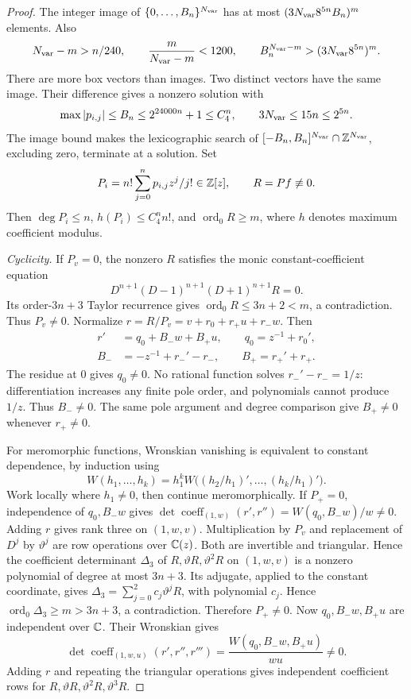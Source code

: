 \begin{proof}
The integer image of $\{0,\ldots,B_n\}^{N_{\rm var}}$ has at most
$(3N_{\rm var}8^{5n}B_n)^m$ elements. Also
\[
 N_{\rm var}-m>n/240,\qquad \frac m{N_{\rm var}-m}<1200,\qquad
 B_n^{N_{\rm var}-m}>(3N_{\rm var}8^{5n})^m.
\]
There are more box vectors than images.
Two distinct vectors have the same image.
Their difference gives a nonzero solution with
\begin{equation}\label{m4:box-bound}
 \max|p_{i,j}|\le B_n\le2^{24000n}+1\le C_4^n,
 \qquad 3N_{\rm var}\le15n\le2^{5n}.
\end{equation}
The image bound makes the lexicographic search of
$[-B_n,B_n]^{N_{\rm var}}\cap\mathbb{Z}^{N_{\rm var}}$, excluding zero, terminate at a
solution. Set
\begin{equation}\label{m4:polynomials}
 P_i=n!\sum_{j=0}^np_{i,j}z^j/j!\in\mathbb{Z}[z],\qquad
 R=Pf\not\equiv0.
\end{equation}
Then $\deg P_i\le n$, $h(P_i)\le C_4^nn!$, and $\operatorname{ord}_0R\ge m$,
where $h$ denotes maximum coefficient modulus.

\emph{Cyclicity.}
If $P_v=0$, the nonzero $R$ satisfies the monic constant-coefficient equation
\[
 D^{n+1}(D-1)^{n+1}(D+1)^{n+1}R=0.
\]
Its order-$3n+3$ Taylor recurrence gives
$\operatorname{ord}_0R\le3n+2<m$, a contradiction. Thus $P_v\ne0$. Normalize $r=R/P_v=v+r_0+r_+u+r_-w$. Then
\begin{equation}\label{m4:derivative}
 \begin{aligned}
 r'&=q_0+B_-w+B_+u,\qquad q_0=z^{-1}+r_0',\\
 B_-&=-z^{-1}+r_-'-r_-,\qquad B_+=r_+'+r_+.
\end{aligned}
\end{equation}
The residue at $0$ gives $q_0\ne0$. No rational function solves
$r_-'-r_-=1/z$: differentiation increases any finite pole order, and
polynomials cannot produce $1/z$. Thus $B_-\ne0$. The same pole argument
and degree comparison give $B_+\ne0$ whenever $r_+\ne0$.

For meromorphic functions, Wronskian vanishing is equivalent to constant
dependence, by induction using
\[
 W(h_1,\ldots,h_k)
 =h_1^kW\bigl((h_2/h_1)',\ldots,(h_k/h_1)'\bigr).
\]
Work locally where $h_1\ne0$, then continue meromorphically.
If $P_+=0$, independence of $q_0,B_-w$ gives
$\det\operatorname{coeff}_{(1,w)}(r',r'')=W(q_0,B_-w)/w\ne0$.
Adding $r$ gives rank three on $(1,w,v)$.
Multiplication by $P_v$ and replacement of $D^j$ by $\vartheta^j$
are row operations over $\mathbb{C}(z)$. Both are invertible and triangular.
Hence the coefficient determinant
$\Delta_3$ of $R,\vartheta R,\vartheta^2R$ on $(1,w,v)$ is a nonzero polynomial
of degree at most $3n+3$.
Its adjugate, applied to the constant coordinate, gives
$\Delta_3=\sum_{j=0}^2c_j\vartheta^jR$, with polynomial $c_j$.
Hence $\operatorname{ord}_0\Delta_3\ge m>3n+3$, a contradiction.
Therefore $P_+\ne0$.
Now $q_0,B_-w,B_+u$ are independent over $\mathbb{C}$.
Their Wronskian gives
\[
 \det\operatorname{coeff}_{(1,w,u)}(r',r'',r''')
 =\frac{W(q_0,B_-w,B_+u)}{wu}\ne0.
\]
Adding $r$ and repeating the triangular operations gives independent
coefficient rows for $R,\vartheta R,\vartheta^2R,\vartheta^3R$.


\end{proof}
